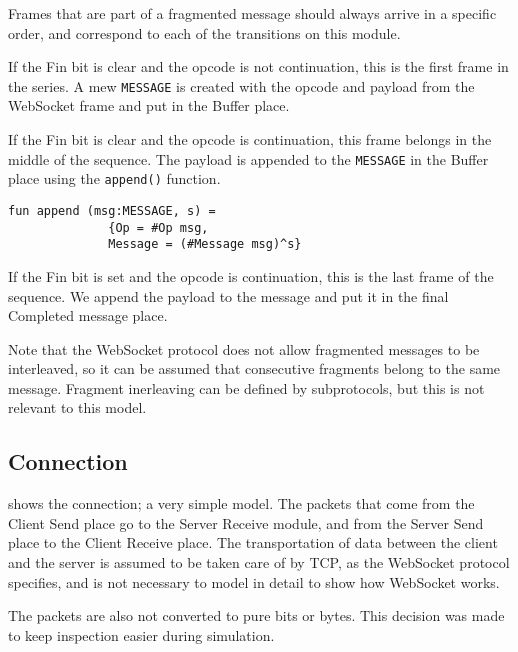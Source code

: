 			
			Frames that are part of a fragmented message should always arrive in a
			specific order, and correspond to each of the transitions on this module. 
			
			If the Fin bit is clear and the opcode is not continuation, this is the first
			frame in the series. A mew \lstinline:MESSAGE: is created with the opcode and
			payload from the WebSocket frame and put in the Buffer place.
			
			If the Fin bit is clear and the opcode is continuation, this frame belongs in
			the middle of the sequence. The payload is appended to the
			\lstinline:MESSAGE: in the Buffer place using the \lstinline:append():
			function.
			
			\begin{lstlisting}[label=lst:append,caption=append,gobble=3]
			fun append (msg:MESSAGE, s) = 
			  {Op = #Op msg,
			  Message = (#Message msg)^s}
			\end{lstlisting}
			
			If the Fin bit is set and the opcode is continuation, this is the last frame
			of the sequence. We append the payload to the message and put it in the final
			Completed message place. 
			
			Note that the WebSocket protocol does not allow fragmented messages to be
			interleaved, so it can be assumed that consecutive fragments belong to the
			same message. Fragment inerleaving can be defined by subprotocols, but this
			is not relevant to this model.
			
\subsection{Connection}

	
	 shows the connection; a very simple model. The packets that
	come from the Client Send place go to the Server Receive module, and from the
	Server Send place to the Client Receive place. The transportation of data
	between the client and the server is assumed to be taken care of by TCP, as
	the WebSocket protocol specifies, and is not necessary to model in detail to
	show how WebSocket works.
	
	The packets are also not converted to pure bits or bytes. This decision was
	made to keep inspection easier during simulation. 

